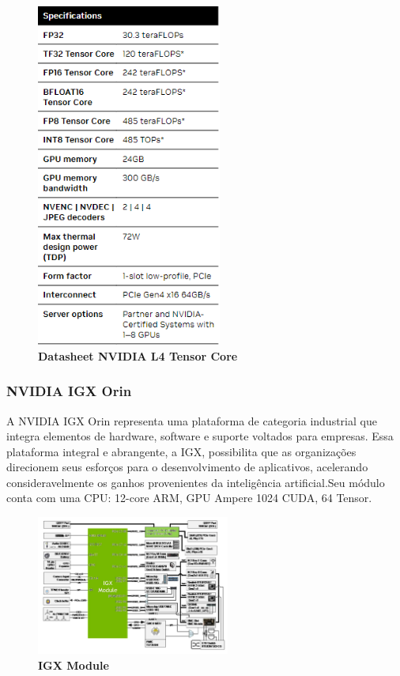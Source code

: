 \documentclass[conference]{IEEEtran}
\begin{document}
\begin{figure}[h]
\centerline{\includegraphics[width = 2.4in]{Screenshot 2023-08-19 230710.png}}
\caption{\textbf{Datasheet NVIDIA L4 Tensor Core}}
\label{figAM9300}
\end{figure}


\subsubsection{NVIDIA IGX Orin}

\par A NVIDIA IGX Orin representa uma plataforma de categoria industrial que integra elementos de hardware, software e suporte voltados para empresas. Essa plataforma integral e abrangente, a IGX, possibilita que as organizações direcionem seus esforços para o desenvolvimento de aplicativos, acelerando consideravelmente os ganhos provenientes da inteligência artificial.Seu módulo conta com uma CPU: 12-core ARM, GPU Ampere 1024 CUDA, 64 Tensor.


\begin{figure}[h]
\centerline{\includegraphics[width = 2.5in]{Screenshot 2023-08-21 191640.png}}
\caption{\textbf{IGX Module}}
\label{figAM9300}
\end{figure}
\end{document}

